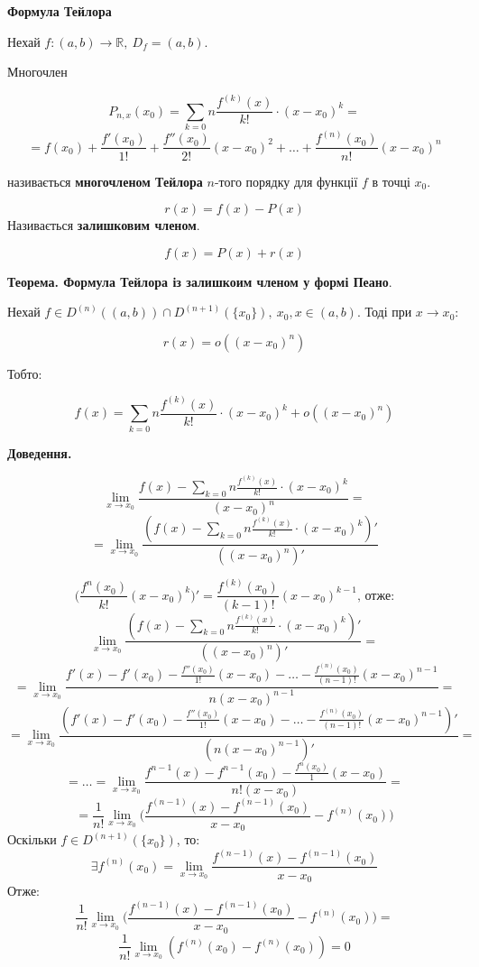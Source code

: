 \documentclass[12pt]{report}
\begin{document}
\begin{center}
\textbf{Формула Тейлора}
\end{center}

Нехай $f : (a,b) \to \mathbb{R},\ D_f = (a,b)$.

Многочлен

$$P_{n,x}(x_0) = \sum_{k = 0}{n}\frac{f^{(k)}(x)}{k!} \cdot (x-x_0)^k = $$
$$= f(x_0) + \frac{f'(x_0)}{1!} + \frac{f''(x_0)}{2!}(x-x_0)^2 + \ldots + \frac{f^{(n)}(x_0)}{n!} (x-x_0)^n$$

називається \textbf{многочленом Тейлора} $n$-того порядку для функції $f$ в точці $x_0$.

$$r(x) = f(x) - P(x)$$
Називається \textbf{залишковим членом}.

$$f(x) = P(x) + r(x)$$

\textbf{Теорема. Формула Тейлора із залишкоим членом у формі Пеано}.

Нехай $f\in D^{(n)}((a,b)) \cap D^{(n+1)}(\{ x_0\}),\ x_0, x \in (a,b)$. Тоді при $x \to x_0$:

$$r(x) = o((x - x_0)^n)$$

Тобто:

$$f(x) = \sum_{k = 0}{n}\frac{f^{(k)}(x)}{k!} \cdot (x-x_0)^k + o((x - x_0)^n)$$

\textbf{Доведення.}

$$\lim_{x\to x_0}\frac{f(x) - \sum_{k = 0}{n}\frac{f^{(k)}(x)}{k!} \cdot (x-x_0)^k}{(x - x_0)^n} = $$
$$ = \lim_{x\to x_0}\frac{(f(x) - \sum_{k = 0}{n}\frac{f^{(k)}(x)}{k!} \cdot (x-x_0)^k)'}{((x - x_0)^n)'} $$

$$\Big(\frac{f^{n}(x_0)}{k!} (x - x_0)^k\Big)' = \frac{f^{(k)}(x_0)}{(k-1)!} (x - x_0)^{k-1}\textrm{, отже:}$$
$$\lim_{x\to x_0}\frac{(f(x) - \sum_{k = 0}{n}\frac{f^{(k)}(x)}{k!} \cdot (x-x_0)^k)'}{((x - x_0)^n)'} = $$
$$= \lim_{x \to x_0}\frac{f'(x) - f'(x_0) - \frac{f''(x_0)}{1!}(x - x_0) - \ldots - \frac{f^{(n)}(x_0)}{(n-1)!} (x - x_0)^{n-1}}{n(x - x_0)^{n-1}} = $$
$$= \lim_{x \to x_0}\frac{(f'(x) - f'(x_0) - \frac{f''(x_0)}{1!}(x - x_0) - \ldots - \frac{f^{(n)}(x_0)}{(n-1)!} (x - x_0)^{n-1})'}{(n(x - x_0)^{n-1})'} = $$
$$= \ldots = \lim_{x \to x_0}\frac{f^{n-1}(x) - f^{n-1}(x_0) - \frac{f^{n}(x_0)}{1} (x - x_0)}{n! (x - x_0)} = $$
$$= \frac{1}{n!} \lim_{x\to x_0}\Big( \frac{f^{(n-1)}(x) - f^{(n-1)}(x_0)}{x - x_0} - f^{(n)}(x_0)\Big)$$
Оскільки $f \in D^{(n+1)}(\{ x_0\})$, то:
$$\exists f^{(n)}(x_0) = \lim_{x\to x_0} \frac{f^{(n-1)}(x) - f^{(n-1)}(x_0)}{x - x_0}$$
Отже: 
$$\frac{1}{n!} \lim_{x\to x_0}\Big( \frac{f^{(n-1)}(x) - f^{(n-1)}(x_0)}{x - x_0} - f^{(n)}(x_0)\Big) = $$
$$\frac{1}{n!} \lim_{x \to x_0}(f^{(n)}(x_0) - f^{(n)}(x_0)) = 0$$
\end{document}
